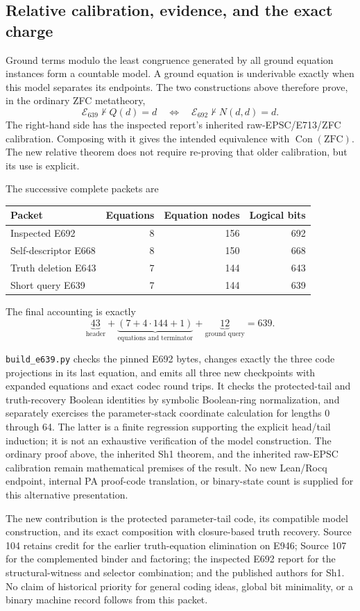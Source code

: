 \subsection{Relative calibration, evidence, and the exact charge}

Ground terms modulo the least congruence generated by all ground equation
instances form a countable model.  A ground equation is underivable
exactly when this model separates its endpoints.  The two constructions
above therefore prove, in the ordinary ZFC metatheory,
\[
 \mathcal E_{639}\nvdash Q(d)=d
 \quad\Longleftrightarrow\quad
 \mathcal E_{692}\nvdash N(d,d)=d.
\]
The right-hand side has the inspected report's inherited raw-EPSC/E713/ZFC
calibration.  Composing with it gives the intended equivalence with
\(\operatorname{Con}(\mathrm{ZFC})\).  The new relative theorem does not
require re-proving that older calibration, but its use is explicit.

The successive complete packets are
\begin{center}
\begin{tabular}{lrrr}
\hline
Packet & Equations & Equation nodes & Logical bits\\
\hline
Inspected E692 & 8 & 156 & 692\\
Self-descriptor E668 & 8 & 150 & 668\\
Truth deletion E643 & 7 & 144 & 643\\
Short query E639 & 7 & 144 & 639\\
\hline
\end{tabular}
\end{center}
The final accounting is exactly
\[
 \underbrace{43}_{\text{header}}
 +\underbrace{(7+4\cdot144+1)}_{\text{equations and terminator}}
 +\underbrace{12}_{\text{ground query}}
 =639.
\]

\texttt{build\_e639.py} checks the pinned E692 bytes, changes exactly the
three code projections in its last equation, and emits all three new
checkpoints with expanded equations and exact codec round trips.  It checks
the protected-tail and truth-recovery Boolean identities by symbolic
Boolean-ring normalization, and separately exercises the parameter-stack
coordinate calculation for lengths 0 through 64.  The latter is a finite
regression supporting the explicit head/tail induction; it is not an
exhaustive verification of the model construction.  The ordinary proof
above, the inherited Sh1 theorem, and the inherited raw-EPSC calibration
remain mathematical premises of the result.  No new Lean/Rocq endpoint,
internal PA proof-code translation, or binary-state count is supplied for
this alternative presentation.

The new contribution is the protected parameter-tail code, its compatible
model construction, and its exact composition with closure-based truth
recovery.  Source 104 retains credit for the earlier truth-equation
elimination on E946; Source 107 for the complemented binder and factoring;
the inspected E692 report for the structural-witness and selector
combination; and the published authors for Sh1.  No claim of historical
priority for general coding ideas, global bit minimality, or a binary
machine record follows from this packet.

